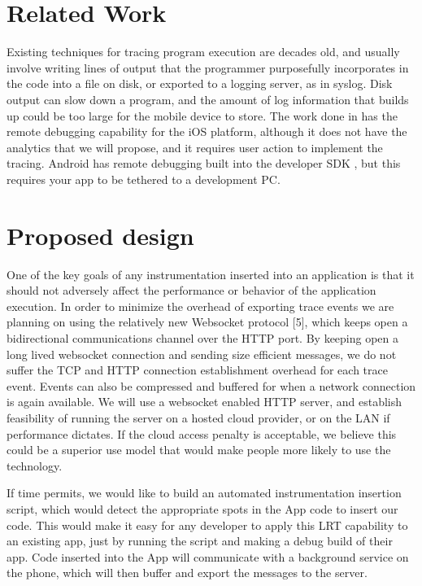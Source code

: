 \documentclass[11pt]{article}
\begin{document}
\section{Related Work} 
Existing techniques for tracing program execution are decades old, and usually 
involve writing lines of output that the programmer purposefully incorporates 
in the code into a file on disk, or exported to a logging server, as in syslog. 
Disk output can slow down a program, and the amount of log information that 
builds up could be too large for the mobile device to store. The work done in 
\cite{NSLogger} has the remote debugging capability for the iOS platform, although 
it does not have the analytics that we will propose, and it requires user action 
to implement the tracing. Android has remote debugging built into the developer 
SDK \cite{AndroidRemoteDebugTool}, but this requires your app to be tethered to a development PC.

\section{Proposed design}
One of the key goals of any instrumentation inserted into an application is 
that it should not adversely affect the performance or behavior of the 
application execution. In order to minimize the overhead of exporting trace 
events we are planning on using the relatively new Websocket protocol [5], 
which keeps open a bidirectional communications channel over the HTTP port. 
By keeping open a long lived websocket connection and sending size efficient 
messages, we do not suffer the TCP and HTTP connection establishment overhead 
for each trace event. Events can also be compressed and buffered for when a 
network connection is again available.  We will use a websocket enabled HTTP 
server, and establish feasibility of running the server on a hosted cloud 
provider, or on the LAN if performance dictates. If the cloud access penalty is 
acceptable, we believe this could be a superior use model that would make people
more likely to use the technology.

If time permits, we would like to build an automated instrumentation insertion 
script, which would detect the appropriate spots in the App code to insert our 
code. This would make it easy for any developer to apply this  LRT capability to
an existing app, just by running the script and making a debug build of their 
app. Code inserted into the App will communicate with a background service on 
the phone, which will then buffer and export the messages to the server.




{}

\end{document}
